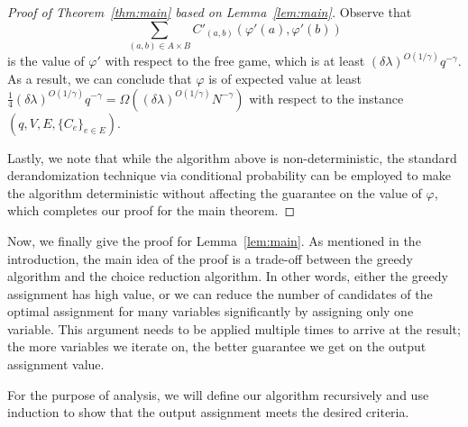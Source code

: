 \documentclass{article}
\begin{document}
\begin{proof}[Proof of Theorem~\ref{thm:main} based on Lemma~\ref{lem:main}]
  Observe that $$\sum_{(a, b) \in A \times B} C'_{(a, b)}(\varphi'(a), \varphi'(b))$$ is the value of $\varphi'$ with respect to the free game, which is at least $(\delta \lambda)^{O(1/\gamma)}q^{-\gamma}$. As a result, we can conclude that $\varphi$ is of expected value at least $\frac{1}{4}(\delta \lambda)^{O(1/\gamma)}q^{-\gamma} = \Omega((\delta \lambda)^{O(1/\gamma)}N^{-\gamma})$ with respect to the instance $(q, V, E, \{C_e\}_{e \in E})$.

  Lastly, we note that while the algorithm above is non-deterministic, the standard derandomization technique via conditional probability can be employed to make the algorithm deterministic without affecting the guarantee on the value of $\varphi$, which completes our proof for the main theorem.
\end{proof}

Now, we finally give the proof for Lemma~\ref{lem:main}. As mentioned in the introduction, the main idea of the proof is a trade-off between the greedy algorithm and the choice reduction algorithm. In other words, either the greedy assignment has high value, or we can reduce the number of candidates of the optimal assignment for many variables significantly by assigning only one variable. This argument needs to be applied multiple times to arrive at the result; the more variables we iterate on, the better guarantee we get on the output assignment value.

For the purpose of analysis, we will define our algorithm recursively and use induction to show that the output assignment meets the desired criteria.
\end{document}
